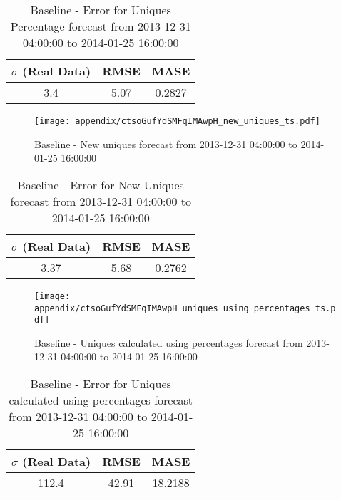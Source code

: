 \begin{table}[H]
\centering
\footnotesize
\begin{tabular}{ccc}
$\sigma$ (Real Data) & RMSE & MASE   \\ \hline
3.4 & 5.07 & 0.2827 \\
\end{tabular}

\vspace{0.5cm}

\caption{
Baseline - Error for Uniques Percentage forecast from 2013-12-31 04:00:00 to 2014-01-25 16:00:00}
\end{table}

\begin{figure}[H] \begin{center} \leavevmode
\texttt{[image: appendix/ctsoGufYdSMFqIMAwpH\_new\_uniques\_ts.pdf]} \caption{
Baseline - New uniques forecast from 2013-12-31 04:00:00 to 2014-01-25 16:00:00} \label{fig:appendix/ctsoGufYdSMFqIMAwpH_new_uniques_ts.pdf} \end{center}
\end{figure}

\begin{table}[H]
\centering
\footnotesize
\begin{tabular}{ccc}
$\sigma$ (Real Data) & RMSE & MASE   \\ \hline
3.37 & 5.68 & 0.2762 \\
\end{tabular}

\vspace{0.5cm}

\caption{
Baseline - Error for New Uniques forecast from 2013-12-31 04:00:00 to 2014-01-25 16:00:00}
\end{table}

\begin{figure}[H] \begin{center} \leavevmode
\texttt{[image: appendix/ctsoGufYdSMFqIMAwpH\_uniques\_using\_percentages\_ts.pdf]} \caption{
Baseline - Uniques calculated using percentages forecast from 2013-12-31 04:00:00 to 2014-01-25 16:00:00} \label{fig:appendix/ctsoGufYdSMFqIMAwpH_uniques_using_percentages_ts.pdf} \end{center}
\end{figure}

\begin{table}[H]
\centering
\footnotesize
\begin{tabular}{ccc}
$\sigma$ (Real Data) & RMSE & MASE   \\ \hline
112.4 & 42.91 & 18.2188 \\
\end{tabular}

\vspace{0.5cm}

\caption{
Baseline - Error for Uniques calculated using percentages forecast from 2013-12-31 04:00:00 to 2014-01-25 16:00:00}
\end{table}

